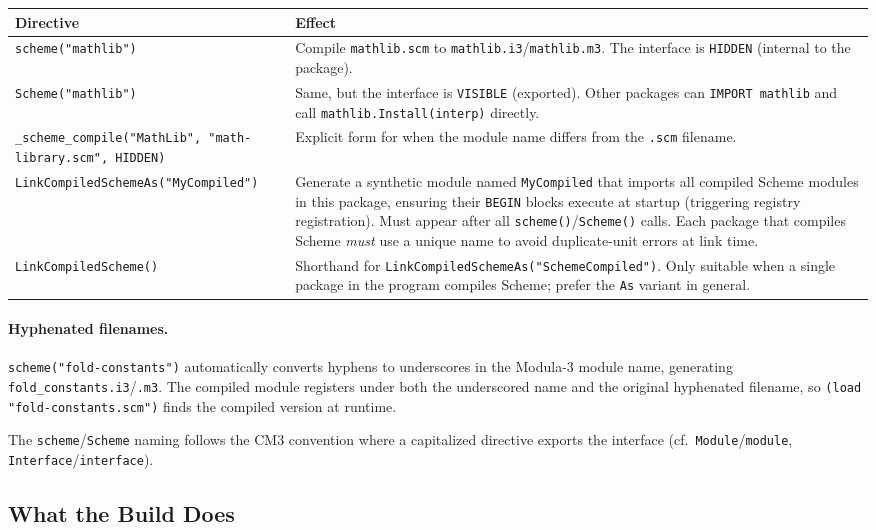 \documentclass[12pt]{report}
\begin{document}
\begin{center}
\begin{tabular}{lp{8cm}}
\toprule
\textbf{Directive} & \textbf{Effect} \\
\midrule
\texttt{scheme("mathlib")} &
  Compile \texttt{mathlib.scm} to \texttt{mathlib.i3}/\texttt{mathlib.m3}.
  The interface is \texttt{HIDDEN} (internal to the package). \\
\texttt{Scheme("mathlib")} &
  Same, but the interface is \texttt{VISIBLE} (exported).
  Other packages can \texttt{IMPORT mathlib} and call
  \texttt{mathlib.Install(interp)} directly. \\
\texttt{\_scheme\_compile("MathLib", "math-library.scm", HIDDEN)} &
  Explicit form for when the module name differs from the
  \texttt{.scm} filename. \\
\texttt{LinkCompiledSchemeAs("MyCompiled")} &
  Generate a synthetic module named \texttt{MyCompiled} that imports
  all compiled Scheme modules in this package, ensuring their
  \texttt{BEGIN} blocks execute at startup (triggering registry
  registration).  Must appear after all
  \texttt{scheme()}/\texttt{Scheme()} calls.
  Each package that compiles Scheme \emph{must} use a unique name
  to avoid duplicate-unit errors at link time. \\
\texttt{LinkCompiledScheme()} &
  Shorthand for \texttt{LinkCompiledSchemeAs("SchemeCompiled")}.
  Only suitable when a single package in the program compiles
  Scheme; prefer the \texttt{As} variant in general. \\
\bottomrule
\end{tabular}
\end{center}

\paragraph{Hyphenated filenames.}
\texttt{scheme("fold-constants")} automatically converts hyphens to
underscores in the Modula-3 module name, generating
\texttt{fold\_constants.i3}/\texttt{.m3}.  The compiled module
registers under both the underscored name and the original hyphenated
filename, so \texttt{(load "fold-constants.scm")} finds the compiled
version at runtime.

The \texttt{scheme}/\texttt{Scheme} naming follows the CM3
convention where a capitalized directive exports the interface
(cf.\ \texttt{Module}/\texttt{module},
\texttt{Interface}/\texttt{interface}).

\subsection{What the Build Does}
\end{document}
